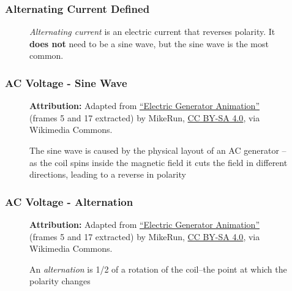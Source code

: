 \begin{frame}
    \frametitle{Alternating Current Defined}

    \begin{figure}
        \centering
        \resizebox{0.75\linewidth}{!}{
            
        }

        {\footnotesize \emph{Alternating current} is an electric current that reverses polarity. It \textbf{does not} need to be a sine wave, but the sine wave is the most common.\par}

    \end{figure}

\end{frame}

\begin{frame}
    \frametitle{AC Voltage - Sine Wave}

    \begin{figure}
        \centering
        \resizebox{0.5\linewidth}{!}{
            
        }

        {\tiny \textbf{Attribution:} Adapted from \href{https://commons.wikimedia.org/wiki/File:Electric-generator-animation.gif}{``Electric Generator Animation''} (frames 5 and 17 extracted) by MikeRun, \href{https://creativecommons.org/licenses/by-sa/4.0}{CC BY-SA 4.0}, via Wikimedia Commons.\\[0.5em]}

        {\footnotesize The sine wave is caused by the physical layout of an AC generator -- as the coil spins inside the magnetic field it cuts the field in different directions, leading to a reverse in polarity\par}

    \end{figure}

\end{frame}

\begin{frame}
    \frametitle{AC Voltage - Alternation}

    \begin{figure}
        \centering
        \resizebox{0.5\linewidth}{!}{
            
        }

        {\tiny \textbf{Attribution:} Adapted from \href{https://commons.wikimedia.org/wiki/File:Electric-generator-animation.gif}{``Electric Generator Animation''} (frames 5 and 17 extracted) by MikeRun, \href{https://creativecommons.org/licenses/by-sa/4.0}{CC BY-SA 4.0}, via Wikimedia Commons.\\[0.5em]}

        {\footnotesize An \emph{alternation} is 1/2 of a rotation of the coil--the point at which the polarity changes\par}

    \end{figure}

\end{frame}

